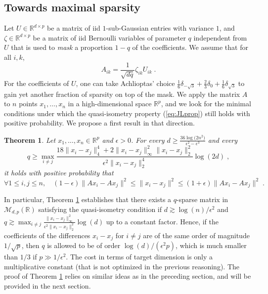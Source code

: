 \documentclass{ps}
\def\R{\mathbb{R}}
\newcommand{\1}{\mathbbm{1}}
\theoremstyle{plain}
\newtheorem{theorem}{Theorem}
\begin{document}
\subsection{Towards maximal sparsity}\label{subsec:min_sparsity}
Let  $U \in \R^{d \times p}$ be a matrix of iid $1$-sub-Gaussian entries with variance $1$, and $\zeta \in \R^{d \times p}$ be a matrix of iid Bernoulli variables of parameter $q$ independent from $U$ that is used to \emph{mask} a proportion $1-q$ of the coefficients. We assume that for all $i,k$,
\begin{equation}\label{eq:sparse_matrix}
    A_{ik} = \frac{1}{\sqrt{dq}}\zeta_{ik} U_{ik} \;.
\end{equation}
For the coefficients of $U$, one can take Achlioptas' choice $\tfrac{1}{6}\delta_{-\sqrt{3}} +\tfrac{2}{3}\delta_0 + \tfrac{1}{6}\delta_{\sqrt{3}}$ to gain yet another fraction of sparsity on top of the mask. We apply the matrix $A$ to $n$ points $x_1, \dots, x_n$ in a high-dimensional space $\R^p$, and we look for the minimal conditions under which the quasi-isometry property (\ref{eq:JLprop}) still holds with positive probability.
We propose a first result in that direction.
\begin{theorem}\label{thm:JLs1s}
Let $x_1,\dots,x_n\in\R^p$ and $\epsilon>0$. For every $\displaystyle{d\geq \frac{36\log\big(2n^2\big)}{\epsilon^2-\epsilon^3}}$ and every 
\begin{equation}\label{eq:cond_q_1}
q\geq \max_{i\neq j}\frac{18 \|x_i-x_j\|_4^4  + 2\|x_i-x_j\|_\infty^2\|x_i-x_j\|_2^2}{\epsilon^2\|x_i-x_j\|_2^4} \log(2d)\;,\end{equation} it holds with positive probability that 
\begin{equation}\label{eq:JLprop} \forall 1\leq i,j\leq n, \quad (1-\epsilon) \|Ax_i-Ax_j\|^2\leq \|x_i-x_j\|^2 \leq (1+\epsilon) \|Ax_i-Ax_j\|^2 \; . \end{equation}
\end{theorem}

In particular, Theorem \ref{thm:JLs1s} establishes that there exists a $q$-sparse matrix in $\mathcal{M}_{d,p}(\R)$ satisfying the quasi-isometry condition if $d \gtrsim \log(n)/\epsilon^2$ and $q \gtrsim \max_{i\neq j}\tfrac{\|x_i - x_j\|^2_{\infty}}{\epsilon^2\|x_i - x_j\|_2^2}\log(d)$ up to a constant factor. Hence, if the coefficients of the differences $x_i - x_j$ for $i \neq j$ are of the same order of magnitude $1/\sqrt{p}$, then $q$ is allowed to be of order $\log(d)/(\epsilon^2p)$, which is much smaller than $1/3$ if $p \gg 1/\epsilon^2$. 
The cost in terms of target dimension is only a multiplicative constant (that is not optimized in the previous reasoning). The proof of Theorem \ref{thm:JLs1s} relies on similar ideas as in the preceding section, and will be provided in the next section.
\end{document}
